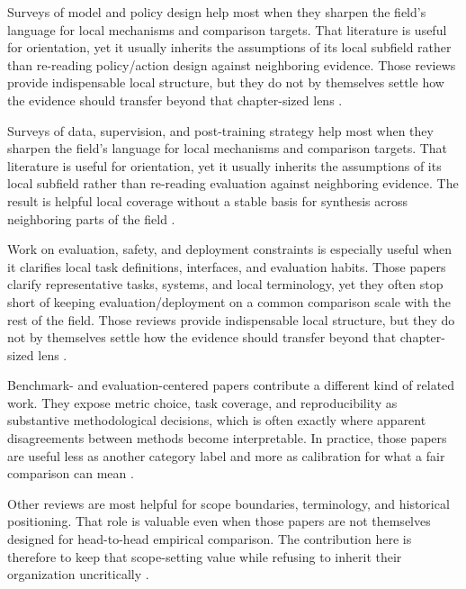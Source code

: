 \documentclass[a4paper,11pt]{article}
\begin{document}
Surveys of model and policy design help most when they sharpen the field's language for local mechanisms and comparison targets. That literature is useful for orientation, yet it usually inherits the assumptions of its local subfield rather than re-reading policy/action design against neighboring evidence. Those reviews provide indispensable local structure, but they do not by themselves settle how the evidence should transfer beyond that chapter-sized lens \citep{Jiang2025Behavior,Eze2024Learning,Kachaev2025Mind,Xu2025Aerial,Wu2024Discrete,Lin2025Echovla}.

Surveys of data, supervision, and post-training strategy help most when they sharpen the field's language for local mechanisms and comparison targets. That literature is useful for orientation, yet it usually inherits the assumptions of its local subfield rather than re-reading evaluation against neighboring evidence. The result is helpful local coverage without a stable basis for synthesis across neighboring parts of the field \citep{Shi2025Diversity,Mandi2022Cacti,Wu2025Moto,Awais2023Foundational,Bai2025Embodied,Black2024Vision}.

Work on evaluation, safety, and deployment constraints is especially useful when it clarifies local task definitions, interfaces, and evaluation habits. Those papers clarify representative tasks, systems, and local terminology, yet they often stop short of keeping evaluation/deployment on a common comparison scale with the rest of the field. Those reviews provide indispensable local structure, but they do not by themselves settle how the evidence should transfer beyond that chapter-sized lens \citep{Brohan2023Vision,Bucker2024Grappa,Chen2021Learning,Chen2025Internvla,Chen2025Once,Cui2025Openhelix}.

Benchmark- and evaluation-centered papers contribute a different kind of related work. They expose metric choice, task coverage, and reproducibility as substantive methodological decisions, which is often exactly where apparent disagreements between methods become interpretable. In practice, those papers are useful less as another category label and more as calibration for what a fair comparison can mean \citep{Dai2025Manitaskgen,Dong2026Capturing,Duggan2026Price,Fang2025From,Gu2025Safe,Hou2025Dita}.

Other reviews are most helpful for scope boundaries, terminology, and historical positioning. That role is valuable even when those papers are not themselves designed for head-to-head empirical comparison. The contribution here is therefore to keep that scope-setting value while refusing to inherit their organization uncritically \citep{Hundt2022Robots,Jiang2025Asyncvla,Jlg2025Robot,Kabir2025Socially,Kawaharazuka2025Vision,Kerr2025Robot}.
\end{document}

